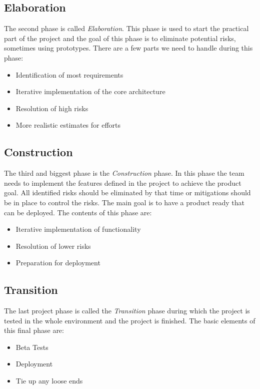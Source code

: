 \subsection{Elaboration}
The second phase is called \textit{Elaboration}. This phase is used to start the practical part of the project and the goal of this phase is to eliminate potential risks, sometimes using prototypes. There are a few parts we need to handle during this phase:
\begin{itemize}
    \item Identification of most requirements
    \item Iterative implementation of the core architecture
    \item Resolution of high risks
    \item More realistic estimates for efforts
\end{itemize}

\subsection{Construction}
The third and biggest phase is the \textit{Construction} phase. In this phase the team needs to implement the features defined in the project to achieve the product goal. All identified risks should be eliminated by that time or mitigations should be in place to control the risks. The main goal is to have a product ready that can be deployed.
The contents of this phase are:
\begin{itemize}
    \item Iterative implementation of functionality
    \item Resolution of lower risks
    \item Preparation for deployment
\end{itemize}

\subsection{Transition}
The last project phase is called the \textit{Transition} phase during which the project is tested in the whole environment and the project is finished.
The basic elements of this final phase are:
\begin{itemize}
    \item Beta Tests
    \item Deployment
    \item Tie up any loose ends
\end{itemize}

